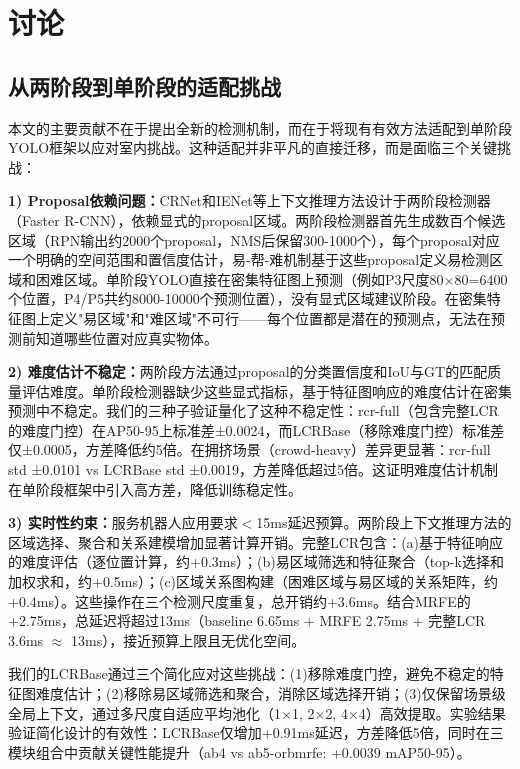 \documentclass[journal]{IEEEtran}
\begin{document}
\section{讨论}
\label{sec:discussion}

\subsection{从两阶段到单阶段的适配挑战}
\label{subsec:adaptation_challenges}

本文的主要贡献不在于提出全新的检测机制，而在于将现有有效方法适配到单阶段YOLO框架以应对室内挑战。这种适配并非平凡的直接迁移，而是面临三个关键挑战：

\textbf{1) Proposal依赖问题：}CRNet和IENet等上下文推理方法设计于两阶段检测器（Faster R-CNN），依赖显式的proposal区域。两阶段检测器首先生成数百个候选区域（RPN输出约2000个proposal，NMS后保留300-1000个），每个proposal对应一个明确的空间范围和置信度估计，易-帮-难机制基于这些proposal定义易检测区域和困难区域。单阶段YOLO直接在密集特征图上预测（例如P3尺度80$\times$80=6400个位置，P4/P5共约8000-10000个预测位置），没有显式区域建议阶段。在密集特征图上定义"易区域"和"难区域"不可行——每个位置都是潜在的预测点，无法在预测前知道哪些位置对应真实物体。

\textbf{2) 难度估计不稳定：}两阶段方法通过proposal的分类置信度和IoU与GT的匹配质量评估难度。单阶段检测器缺少这些显式指标，基于特征图响应的难度估计在密集预测中不稳定。我们的三种子验证量化了这种不稳定性：rcr-full（包含完整LCR的难度门控）在AP50-95上标准差±0.0024，而LCRBase（移除难度门控）标准差仅±0.0005，方差降低约5倍。在拥挤场景（crowd-heavy）差异更显著：rcr-full std ±0.0101 vs LCRBase std ±0.0019，方差降低超过5倍。这证明难度估计机制在单阶段框架中引入高方差，降低训练稳定性。

\textbf{3) 实时性约束：}服务机器人应用要求$<$15ms延迟预算。两阶段上下文推理方法的区域选择、聚合和关系建模增加显著计算开销。完整LCR包含：(a)基于特征响应的难度评估（逐位置计算，约+0.3ms）；(b)易区域筛选和特征聚合（top-k选择和加权求和，约+0.5ms）；(c)区域关系图构建（困难区域与易区域的关系矩阵，约+0.4ms）。这些操作在三个检测尺度重复，总开销约+3.6ms。结合MRFE的+2.75ms，总延迟将超过13ms（baseline 6.65ms + MRFE 2.75ms + 完整LCR 3.6ms $\approx$ 13ms），接近预算上限且无优化空间。

我们的LCRBase通过三个简化应对这些挑战：(1)移除难度门控，避免不稳定的特征图难度估计；(2)移除易区域筛选和聚合，消除区域选择开销；(3)仅保留场景级全局上下文，通过多尺度自适应平均池化（1$\times$1, 2$\times$2, 4$\times$4）高效提取。实验结果验证简化设计的有效性：LCRBase仅增加+0.91ms延迟，方差降低5倍，同时在三模块组合中贡献关键性能提升（ab4 vs ab5-orbmrfe: +0.0039 mAP50-95）。
\end{document}
